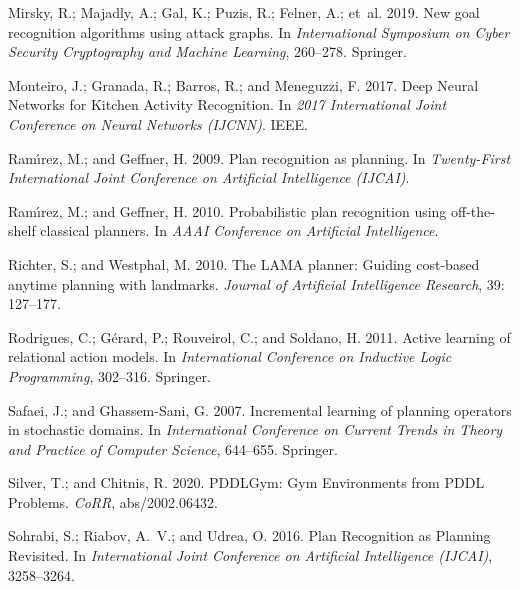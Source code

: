 \documentclass[letterpaper]{article} %
\begin{document}
\begin{thebibliography}{30}
Mirsky, R.; Majadly, A.; Gal, K.; Puzis, R.; Felner, A.; et~al. 2019.
\newblock New goal recognition algorithms using attack graphs.
\newblock In \emph{International Symposium on Cyber Security Cryptography and
  Machine Learning}, 260--278. Springer.

Monteiro, J.; Granada, R.; Barros, R.; and Meneguzzi, F. 2017.
\newblock Deep Neural Networks for Kitchen Activity Recognition.
\newblock In \emph{2017 International Joint Conference on Neural Networks
  (IJCNN)}. IEEE.

Ram{\'\i}rez, M.; and Geffner, H. 2009.
\newblock Plan recognition as planning.
\newblock In \emph{Twenty-First International Joint Conference on Artificial
  Intelligence (IJCAI)}.

Ram{\'\i}rez, M.; and Geffner, H. 2010.
\newblock Probabilistic plan recognition using off-the-shelf classical
  planners.
\newblock In \emph{AAAI Conference on Artificial Intelligence}.

Richter, S.; and Westphal, M. 2010.
\newblock The LAMA planner: Guiding cost-based anytime planning with landmarks.
\newblock \emph{Journal of Artificial Intelligence Research}, 39: 127--177.

Rodrigues, C.; G{\'e}rard, P.; Rouveirol, C.; and Soldano, H. 2011.
\newblock Active learning of relational action models.
\newblock In \emph{International Conference on Inductive Logic Programming},
  302--316. Springer.

Safaei, J.; and Ghassem-Sani, G. 2007.
\newblock Incremental learning of planning operators in stochastic domains.
\newblock In \emph{International Conference on Current Trends in Theory and
  Practice of Computer Science}, 644--655. Springer.

Silver, T.; and Chitnis, R. 2020.
\newblock PDDLGym: Gym Environments from {PDDL} Problems.
\newblock \emph{CoRR}, abs/2002.06432.

Sohrabi, S.; Riabov, A.~V.; and Udrea, O. 2016.
\newblock Plan Recognition as Planning Revisited.
\newblock In \emph{International Joint Conference on Artificial Intelligence
  ({IJCAI})}, 3258--3264.


\end{thebibliography}
\end{document}
